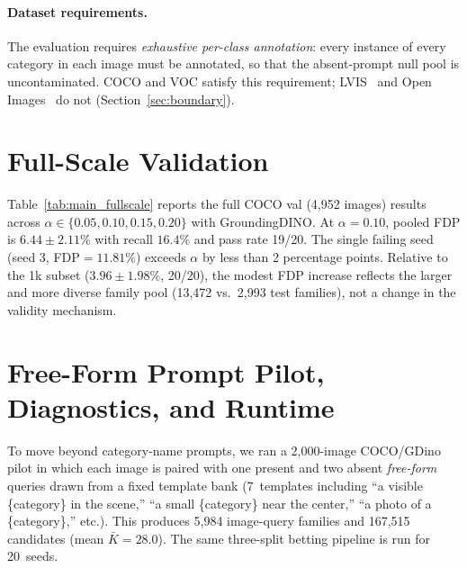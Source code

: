\documentclass{article}
\theoremstyle{remark}
\newcommand{\1}{\mathbf{1}}
\begin{document}
\paragraph{Dataset requirements.}
The evaluation requires \emph{exhaustive per-class annotation}: every
instance of every category in each image must be annotated, so that the
absent-prompt null pool is uncontaminated. COCO and VOC satisfy this
requirement; LVIS~\cite{gupta2019lvis} and
Open Images~\cite{kuznetsova2020open} do not
(Section~\ref{sec:boundary}).

\section{Full-Scale Validation}
\label{app:fullscale}

Table~\ref{tab:main_fullscale} reports the full COCO val (4{,}952 images)
results across $\alpha\in\{0.05,0.10,0.15,0.20\}$ with GroundingDINO.
At $\alpha=0.10$, pooled FDP is $6.44 \pm 2.11\%$ with recall $16.4\%$ and
pass rate 19/20. The single failing seed (seed 3, FDP${}=11.81\%$) exceeds
$\alpha$ by less than 2 percentage points. Relative to the 1k subset
($3.96 \pm 1.98\%$, 20/20), the modest FDP increase reflects the larger and
more diverse family pool (13{,}472 vs.\ 2{,}993 test families), not a change in
the validity mechanism.

\section{Free-Form Prompt Pilot, Diagnostics, and Runtime}
\label{app:freeform}

To move beyond category-name prompts, we ran a 2{,}000-image COCO/GDino
pilot in which each image is paired with one present and two absent
\emph{free-form} queries drawn from a fixed template bank (7~templates
including ``a visible \{category\} in the scene,'' ``a small \{category\}
near the center,'' ``a photo of a \{category\},'' etc.).  This produces
5{,}984 image-query families and 167{,}515 candidates (mean
$\bar{K}\!=\!28.0$).  The same three-split betting pipeline is run for
20~seeds.
\end{document}
